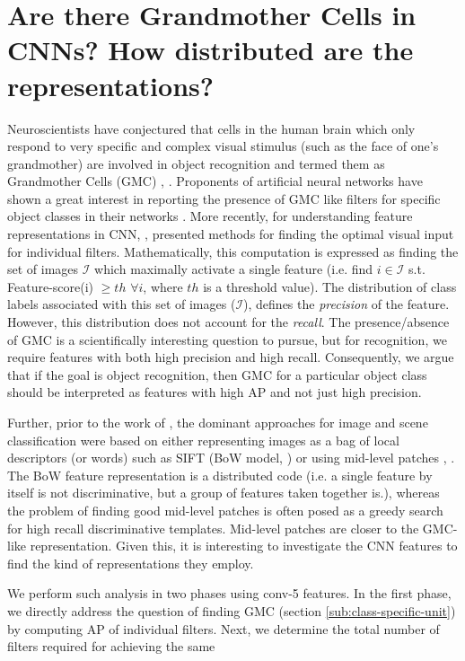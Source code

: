 \section{Are there Grandmother Cells in CNNs? How distributed are the representations?}
\label{sec:grand-mother}
Neuroscientists have conjectured that cells in the human brain which only respond to very specific and complex visual stimulus (such as the face of one's grandmother) are involved in object recognition and termed them as Grandmother Cells (GMC) \cite{Barlow}, \cite{Grandmother}. Proponents of artificial neural networks have shown a great interest in reporting the presence of GMC like filters for specific object classes in their networks \cite{GoogleCat}. More recently, for understanding feature representations in CNN, \cite{DeConv}, \cite{Simonyan} presented methods for finding the optimal visual input for individual filters. Mathematically, this computation is expressed as finding the set of images $\mathcal{I}$ which maximally activate a single feature (i.e. find $i \in \mathcal{I}$ s.t. Feature-score(i) $\geq th$ $\forall i $, where $th$ is a threshold value). The distribution of class labels associated with this set of images ($\mathcal{I}$), defines the \textit{precision} of the feature. However, this distribution does not account for the \textit{recall}.  The presence/absence of GMC is a scientifically interesting question to pursue, but for recognition, we require features with both high precision and high recall. Consequently, we argue that if the goal is object recognition, then GMC for a particular object class should be interpreted as features with high AP and not just high precision. 
 
Further, prior to the work of \cite{Kriz}, the dominant approaches for image and scene classification were based on either representing images as a bag of local descriptors (or words) such as SIFT (BoW model, \cite{SPM}) or using mid-level patches \cite{Mid1}, \cite{Blocks}. The BoW feature representation is a distributed code (i.e. a single feature by itself is not discriminative, but a group of features taken together is.), whereas the problem of finding good mid-level patches is often posed as a greedy search for high recall discriminative templates. Mid-level patches are closer to the GMC-like representation. Given this, it is interesting to investigate the CNN features to find the kind of representations they employ.

We perform such analysis in two phases using conv-5 features. In the first phase, we directly address the question of finding GMC (section \ref{sub:class-specific-unit}) by computing AP of individual filters. Next, we determine the total number of filters required for achieving the same 

